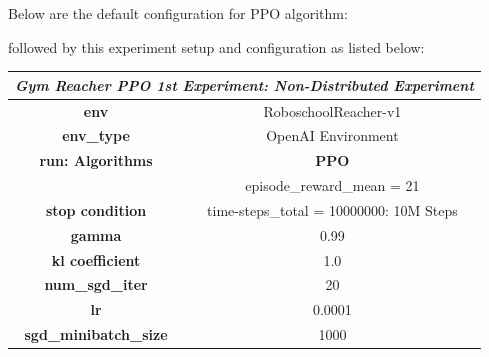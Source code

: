 Below are the default configuration for PPO algorithm:


followed by this experiment setup and configuration as listed below:
\begin{table}[!htb]
		\centering
		\begin{tabular}{|c|l|l|c|l|l|}
				\hline
				\multicolumn{6}{|c|}{\textit{\textbf{Gym Reacher PPO 1st Experiment: Non-Distributed Experiment}}}                                                        \\ \hline
				\multicolumn{3}{|c|}{\textbf{env}}                                  & \multicolumn{3}{c|}{RoboschoolReacher-v1}                                           \\ \hline
				\multicolumn{3}{|c|}{\textbf{env\_type}}                            & \multicolumn{3}{c|}{OpenAI Environment}                                             \\ \hline
				\multicolumn{3}{|c|}{\textbf{run: Algorithms}}                      & \multicolumn{3}{c|}{\cellcolor[HTML]{C0C0C0}\textbf{PPO}}                           \\ \hline
				\multicolumn{3}{|c|}{}                                              & \multicolumn{3}{c|}{\cellcolor[HTML]{E1F7E1}episode\_reward\_mean = 21}             \\ \cline{4-6} 
				\multicolumn{3}{|c|}{\multirow{-2}{*}{\textbf{stop condition}}}     & \multicolumn{3}{c|}{\cellcolor[HTML]{E1F7E1}time-steps\_total = 10000000: 10M Steps} \\ \hline
				\multicolumn{3}{|c|}{\textbf{gamma}}                                & \multicolumn{3}{c|}{0.99}                                                           \\ \hline
				\multicolumn{3}{|c|}{\textbf{kl coefficient}}                            & \multicolumn{3}{c|}{1.0}                                                            \\ \hline
				\multicolumn{3}{|c|}{\textbf{num\_sgd\_iter}}                       & \multicolumn{3}{c|}{20}                                                             \\ \hline
				\multicolumn{3}{|c|}{\textbf{lr}}                                   & \multicolumn{3}{c|}{0.0001}                                                         \\ \hline
				\multicolumn{3}{|c|}{\textbf{sgd\_minibatch\_size}}                 & \multicolumn{3}{c|}{1000}                                                           \\ \hline

\end{tabular}
\end{table}
